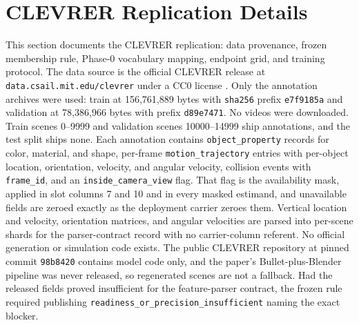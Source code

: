 \section{CLEVRER Replication Details}
\label{sec:app:clevrer}

This section documents the CLEVRER replication: data provenance, frozen membership rule, Phase-0 vocabulary mapping, endpoint grid, and training protocol.
The data source is the official CLEVRER release at \texttt{data.csail.mit.edu/\allowbreak clevrer} under a CC0 license \citep{yi2020clevrer}. Only the annotation archives were used: train at 156{,}761{,}889 bytes with \texttt{sha256} prefix \texttt{e7f9185a} and validation at 78{,}386{,}966 bytes with prefix \texttt{d89e7471}. No videos were downloaded. Train scenes 0--9999 and validation scenes 10000--14999 ship annotations, and the test split ships none. Each annotation contains \texttt{object\_property} records for color, material, and shape, per-frame \texttt{motion\_trajectory} entries with per-object location, orientation, velocity, and angular velocity, collision events with \texttt{frame\_id}, and an \texttt{inside\_camera\_view} flag. That flag is the availability mask, applied in slot columns 7 and 10 and in every masked estimand, and unavailable fields are zeroed exactly as the deployment carrier zeroes them. Vertical location and velocity, orientation matrices, and angular velocities are parsed into per-scene shards for the parser-contract record with no carrier-column referent. No official generation or simulation code exists. The public CLEVRER repository at pinned commit \texttt{98b8420} contains model code only, and the paper's Bullet-plus-Blender pipeline was never released, so regenerated scenes are not a fallback. Had the released fields proved insufficient for the feature-parser contract, the frozen rule required publishing \texttt{readiness\_or\_precision\_\allowbreak insufficient} naming the exact blocker.

